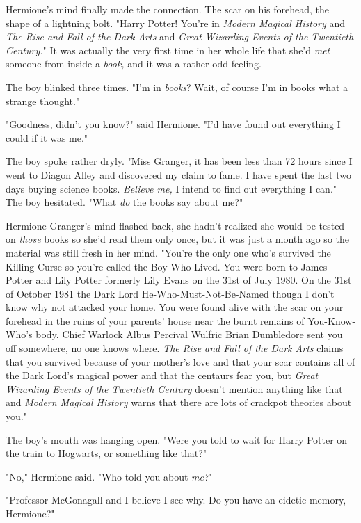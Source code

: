 Hermione's mind finally made the connection. The scar on his forehead, the
shape of a lightning bolt. "Harry Potter! You're in \emph{Modern Magical
History} and \emph{The Rise and Fall of the Dark Arts} and \emph{Great
Wizarding Events of the Twentieth Century.}" It was actually the very first
time in her whole life that she'd \emph{met} someone from inside a \emph{book,}
and it was a rather odd feeling.

The boy blinked three times. "I'm in \emph{books}? Wait, of course I'm in
books{\el} what a strange thought."

"Goodness, didn't you know?" said Hermione. "I'd have found out everything I
could if it was me."

The boy spoke rather dryly. "Miss Granger, it has been less than 72 hours since
I went to Diagon Alley and discovered my claim to fame. I have spent the last
two days buying science books. \emph{Believe me,} I intend to find out
everything I can." The boy hesitated. "What \emph{do} the books say about me?"

Hermione Granger's mind flashed back, she hadn't realized she would be tested
on \emph{those} books so she'd read them only once, but it was just a month ago
so the material was still fresh in her mind. "You're the only one who's
survived the Killing Curse so you're called the Boy-Who-Lived. You were born to
James Potter and Lily Potter formerly Lily Evans on the 31st of July 1980. On
the 31st of October 1981 the Dark Lord He-Who-Must-Not-Be-Named though I don't
know why not attacked your home. You were found alive with the scar on your
forehead in the ruins of your parents' house near the burnt remains of
You-Know-Who's body. Chief Warlock Albus Percival Wulfric Brian Dumbledore sent
you off somewhere, no one knows where. \emph{The Rise and Fall of the Dark
Arts} claims that you survived because of your mother's love and that your scar
contains all of the Dark Lord's magical power and that the centaurs fear you,
but \emph{Great Wizarding Events of the Twentieth Century} doesn't mention
anything like that and \emph{Modern Magical History} warns that there are lots
of crackpot theories about you."

The boy's mouth was hanging open. "Were you told to wait for Harry Potter on
the train to Hogwarts, or something like that?"

"No," Hermione said. "Who told you about \emph{me?}"

"Professor McGonagall and I believe I see why. Do you have an eidetic memory,
Hermione?"


